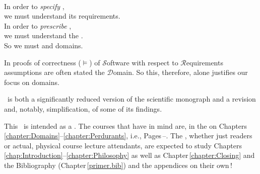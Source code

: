 

\label{chap:Introduction}\label{chap:Introduction.1}
\minitoc


\begin{flushright}\label{intro:The Triptych Dogma}
\\[4mm]
\sf In order to \textsl{specify} ,\\
\sf we must understand its requirements.\\[1mm]
\sf In order to \textsl{prescribe} ,\\
\sf we must understand the .\\[1mm]
\sf So we must  and  domains.\\
\end{flushright}\rm%
\mnewfoil

\noindent
\begynd
\pind In proofs of correctness ($\models$)
\begynd
\pind of $\mathcal{S}$oftware
\pind with respect to $\mathcal{R}$equirements
\pind assumptions are often stated  the $\mathcal{D}$omain.
\afslut
\pind So this, therefore, alone justifies our focus on domains.
\afslut
\endboiteepaisseavecuntitre

\mnewfoil

\noindent
\begynd
\pind {} \primer\ is 
\begynd
\pind both a significantly reduced version \nyl of the scientific monograph \cite{BjornerMonograph2020} 
\pind and a revision and, notably, simplification, of some of its findings.  
\afslut
\afslut

\label{sec:Why This Primer}

\begynd
\pind This \primer\ is intended as a .
\pind The courses that  have in mind are, in the
\ysfchg{, }  on
      Chapters\,\ref{chapter:Domains}--\ref{chapter:Perdurants},
      i.e., Pages\,\pageref{chapter:Domains}--\pageref{chapter:Perdurants.n}.
\pind The , whether just readers or actual,
      physical course lecture attendants, are expected to study
      Chapters\,\ref{chap:Introduction}--\ref{chapter:Philosophy} as
      well as Chapter\,\ref{chapter:Closing} and the Bibliography
      (Chapter\,\ref{primer.bib}) and the appendices on their own\,! 
\afslut

